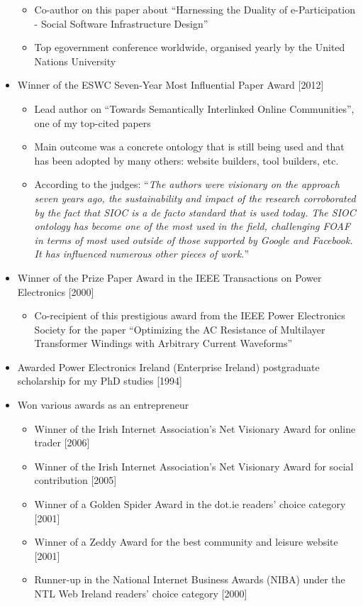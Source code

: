 \documentclass[10pt,a4paper]{res} %
\begin{document}
\begin{resume}
\begin{itemize}
\begin{itemize} \itemsep -2pt
\item Co-author on this paper about ``Harnessing the Duality of e-Participation - Social Software Infrastructure Design''
\item Top egovernment conference worldwide, organised yearly by the United Nations University
\end{itemize}
\item Winner of the ESWC Seven-Year Most Influential Paper Award [2012]
\begin{itemize} \itemsep -2pt
\item Lead author on ``Towards Semantically Interlinked Online Communities'', one of my top-cited papers
\item Main outcome was a concrete ontology that is still being used and that has been adopted by many others: website builders, tool builders, etc.
\item According to the judges: ``\textit{The authors were visionary on the approach seven years ago, the sustainability and impact of the research corroborated by the fact that SIOC is a de facto standard that is used today. The SIOC ontology has become one of the most used in the field, challenging FOAF in terms of most used outside of those supported by Google and Facebook. It has influenced numerous other pieces of work.}''
\end{itemize}
\item Winner of the Prize Paper Award in the IEEE Transactions on Power Electronics [2000]
\begin{itemize} \itemsep -2pt
\item Co-recipient of this prestigious award from the IEEE Power Electronics Society for the paper ``Optimizing the AC Resistance of Multilayer Transformer Windings with Arbitrary Current Waveforms''
\end{itemize}
\item Awarded Power Electronics Ireland (Enterprise Ireland) postgraduate scholarship for my PhD studies [1994]
\item Won various awards as an entrepreneur
\begin{itemize} \itemsep -2pt
\item Winner of the Irish Internet Association's Net Visionary Award for online trader [2006]
\item Winner of the Irish Internet Association's Net Visionary Award for social contribution [2005]
\item Winner of a Golden Spider Award in the dot.ie readers' choice category [2001]
\item Winner of a Zeddy Award for the best community and leisure website [2001]
\item Runner-up in the National Internet Business Awards (NIBA) under the NTL Web Ireland readers' choice category [2000]
\end{itemize}
\end{itemize}


\end{resume}
\end{document}
